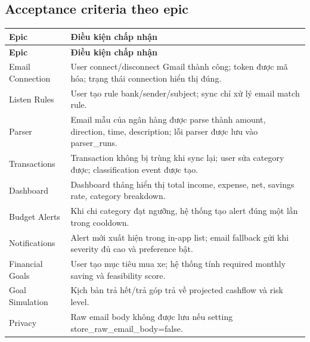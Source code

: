 \documentclass[11pt,a4paper]{article}
\renewcommand{\thead}[1]{\textbf{\color{PrimaryDark}#1}}
\newenvironment{tableblock}{\Needspace{8\baselineskip}\vspace{0.25em}}{\vspace{0.75em}}
\begin{document}
\subsection{Acceptance criteria theo epic}
\begin{tableblock}
\scriptsize
\begin{longtable}{L{3.6cm}L{11.7cm}}
\thead{Epic} & \thead{Điều kiện chấp nhận} \\
\endfirsthead
{}\thead{Epic} & \thead{Điều kiện chấp nhận} \\
\endhead
Email Connection & User connect/disconnect Gmail thành công; token được mã hóa; trạng thái connection hiển thị đúng. \\
Listen Rules & User tạo rule bank/sender/subject; sync chỉ xử lý email match rule. \\
Parser & Email mẫu của ngân hàng được parse thành amount, direction, time, description; lỗi parser được lưu vào parser\_runs. \\
Transactions & Transaction không bị trùng khi sync lại; user sửa category được; classification event được tạo. \\
Dashboard & Dashboard tháng hiển thị total income, expense, net, savings rate, category breakdown. \\
Budget Alerts & Khi chi category đạt ngưỡng, hệ thống tạo alert đúng một lần trong cooldown. \\
Notifications & Alert mới xuất hiện trong in-app list; email fallback gửi khi severity đủ cao và preference bật. \\
Financial Goals & User tạo mục tiêu mua xe; hệ thống tính required monthly saving và feasibility score. \\
Goal Simulation & Kịch bản trả hết/trả góp trả về projected cashflow và risk level. \\
Privacy & Raw email body không được lưu nếu setting store\_raw\_email\_body=false. \\
\end{longtable}
\end{tableblock}
\end{document}
